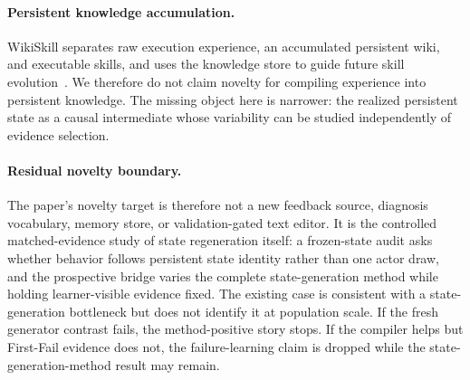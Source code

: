 \paragraph{Persistent knowledge accumulation.}
WikiSkill separates raw execution experience, an accumulated persistent wiki, and executable skills, and uses the knowledge store to guide future skill evolution~\citep{tang2026wikiskill}. We therefore do not claim novelty for compiling experience into persistent knowledge. The missing object here is narrower: the realized persistent state as a causal intermediate whose variability can be studied independently of evidence selection.

\paragraph{Residual novelty boundary.}
The paper's novelty target is therefore not a new feedback source, diagnosis vocabulary, memory store, or validation-gated text editor. It is the controlled matched-evidence study of state regeneration itself: a frozen-state audit asks whether behavior follows persistent state identity rather than one actor draw, and the prospective bridge varies the complete state-generation method while holding learner-visible evidence fixed. The existing case is consistent with a state-generation bottleneck but does not identify it at population scale. If the fresh generator contrast fails, the method-positive story stops. If the compiler helps but First-Fail evidence does not, the failure-learning claim is dropped while the state-generation-method result may remain.
